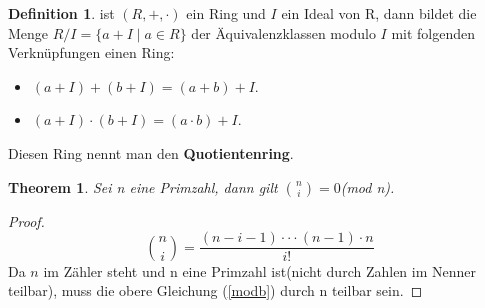 \documentclass[12pt,oneside]{article}
\newtheorem{theorem}{Theorem}[section]
\theoremstyle{remark}
\theoremstyle{definition}
\newtheorem{definition}{Definition}[section]
\begin{document}
\smallskip 

\begin{definition}
ist $(R, +, \cdot)$ ein Ring und $I$ ein Ideal von R, dann bildet die Menge $R/I = \{ a + I \mid a \in R\}$ der Äquivalenzklassen modulo $I$ mit folgenden Verknüpfungen einen Ring:
\begin{itemize}
    \item $(a + I) + (b + I) = (a + b) + I$.
    \item $(a + I) \cdot (b + I) = (a \cdot b ) + I$.\newline
\end{itemize}
Diesen Ring nennt man den \textbf{Quotientenring}. 
\end{definition}

\smallskip

\begin{theorem}\label{th_25}
Sei n eine Primzahl, dann gilt ${n \choose i} = 0 $(mod n).
\end{theorem}

\begin{proof}
\begin{equation}\label{modb}
    {n \choose i} = \frac{(n - i - 1) \cdot \cdot \cdot (n - 1) \cdot n }{i!}
\end{equation}
Da $n$ im Zähler steht und n eine Primzahl ist(nicht durch Zahlen im Nenner teilbar), muss die obere Gleichung (\ref{modb}) durch n teilbar sein. 
\end{proof}
\end{document}
